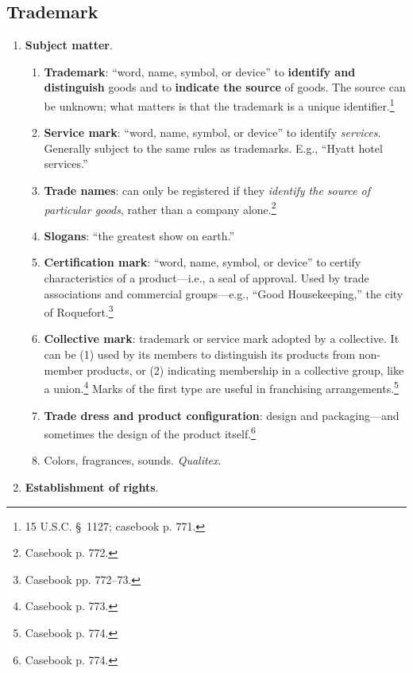 \newpage

\subsection{Trademark}

\begin{enumerate}
    \item \textbf{Subject matter}.
    \begin{enumerate}
        \item \textbf{Trademark}: ``word, name, symbol, or device'' to 
        \textbf{identify and distinguish} goods and to \textbf{indicate the 
        source} of goods. The source can be unknown; what matters is that the 
        trademark is a unique identifier.\footnote{15 U.S.C. \S\ 1127; 
        casebook p.  771.}
        \item \textbf{Service mark}: ``word, name, symbol, or device'' to 
        identify \emph{services}. Generally subject to the same rules as 
        trademarks. E.g., ``Hyatt hotel services.''
        \item \textbf{Trade names}: can only be registered if they 
        \emph{identify the source of particular goods}, rather than a company 
        alone.\footnote{Casebook p. 772.}
        \item \textbf{Slogans}: ``the greatest show on earth.''
        \item \textbf{Certification mark}: ``word, name, symbol, or device'' 
        to certify characteristics of a product---i.e., a seal of approval. 
        Used by trade associations and commercial groups---e.g., ``Good 
        Housekeeping,'' the city of Roquefort.\footnote{Casebook pp. 772--73.}
        \item \textbf{Collective mark}: trademark or service mark adopted by a 
        collective. It can be (1) used by its members to distinguish its 
        products from non-member products, or (2) indicating membership in a 
        collective group, like a union.\footnote{Casebook p. 773.} Marks of 
        the first type are useful in franchising 
        arrangements.\footnote{Casebook p. 774.}
        \item \textbf{Trade dress and product configuration}: design and 
        packaging---and sometimes the design of the product 
        itself.\footnote{Casebook p. 774.}
        \item Colors, fragrances, sounds. \emph{Qualitex}.
    \end{enumerate}
    \item \textbf{Establishment of rights}.

\end{enumerate}
